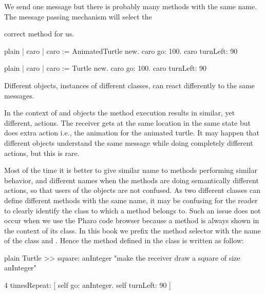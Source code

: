 \documentclass[10pt,twoside,english]{_support/latex/sbabook/sbabook}
\begin{document}
\begin{important}
We send one message but there is probably many methods with the same name. The message passing mechanism will select the
\end{important}

correct method for us. 

\begin{displaycode}{plain}
| caro |
caro := AnimatedTurtle new.
caro go: 100.
caro turnLeft: 90
\end{displaycode}

\begin{displaycode}{plain}
| caro |
caro := Turtle new.
caro go: 100.
caro turnLeft: 90
\end{displaycode}

\begin{important}
Different objects, instances of different classes, can react differently to the same messages.
\end{important}

In the context of  and  objects the method execution results in similar, yet different, actions. The receiver gets at the same location in the same state but does extra action i.e., the animation for the animated turtle.  It may happen that different objects understand the same message while doing completely different actions, but this is rare.  

Most of the time it is better to give similar name to methods performing similar behavior, and different names when the methods are doing semantically different actions, so that users of the objects are not confused. As two different classes can define different methods with the same name, it may be confusing for the reader to clearly identify the class to which a method belongs to. Such an issue does not occur when we use the Pharo code browser because a method is always shown in the context of its class. In this book we prefix the method selector with the name of the class and \textcode{ \textgreater{}\textgreater{}}. Hence the method  defined in the class  is written as follow: 

\begin{displaycode}{plain}
Turtle >> square: anInteger
   "make the receiver draw a square of size anInteger"

   4 timesRepeat: [ self go: anInteger. 
                   self turnLeft: 90 ]
\end{displaycode}
\end{document}

